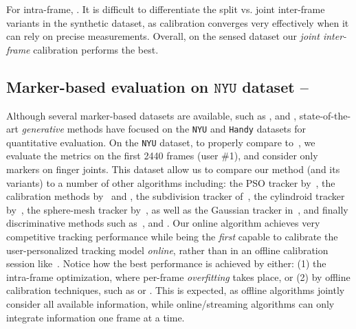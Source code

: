 For intra-frame, .
It is difficult to differentiate the split vs. joint inter-frame variants in the synthetic dataset, as calibration converges very effectively when it can rely on precise measurements. Overall, on the sensed dataset our \emph{joint inter-frame} calibration performs the best.


\subsection{Marker-based evaluation on $\texttt{NYU}$ dataset --
}
\label{sec:evalnyu}
Although several marker-based datasets are available, such as \cite{qian2014realtime}, \cite{sharp2015accurate} and \cite{yuan2017bighand}, state-of-the-art \emph{generative} methods have focused on the \texttt{NYU} \cite{tompson2014real} and \texttt{Handy} \cite{tkach2016sphere} datasets for quantitative evaluation. 
On the \texttt{NYU} dataset, to properly compare to~\cite{taylor2016joint}, we evaluate the metrics on the first 2440 frames (user \#1), and consider only markers on finger joints.
%
This dataset allow us to compare our method (and its variants) to a number of other algorithms including: the PSO tracker by~\cite{sharp2015accurate}, the calibration methods by~\cite{khamis2015learning} and \cite{tan2016fits}, the subdivision tracker of~\cite{taylor2016joint}, the cylindroid tracker by~\cite{htrack}, the sphere-mesh tracker by~\cite{tkach2016sphere}, as well as the Gaussian tracker in~\cite{sridhar2015fast}, and finally discriminative methods such as~\cite{tompson2014real}, \cite{tang2015opening} and \cite{oberweger2015hands}. 
% 
% 
Our online algorithm achieves very competitive tracking performance while being the \emph{first} capable to calibrate the user-personalized tracking model \emph{online}, rather than in an offline calibration session like~\cite{taylor2016joint}. 
% 
Notice how the best performance is achieved by either: (1) the intra-frame optimization, where per-frame \emph{overfitting} takes place, or (2) by offline calibration techniques, such as \OfflineSoft{} or \cite{taylor2016joint}. This is expected, as offline algorithms jointly consider all available information, while online/streaming algorithms can only integrate information one frame at a time.

